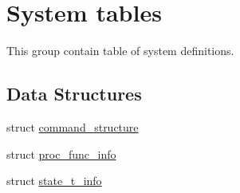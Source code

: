 \hypertarget{group__tables}{
\section{\-System tables}
\label{group__tables}
}


\-This group contain table of system definitions.  


\subsection*{\-Data \-Structures}
\begin{DoxyCompactItemize}
\item 
struct \hyperlink{structcommand__structure}{command\-\_\-structure}
\item 
struct \hyperlink{structproc__func__info}{proc\-\_\-func\-\_\-info}
\item 
struct \hyperlink{structstate__t__info}{state\-\_\-t\-\_\-info}
\end{DoxyCompactItemize}
